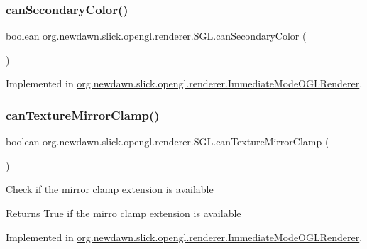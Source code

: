 \subsubsection{\texorpdfstring{can\+Secondary\+Color()}{canSecondaryColor()}}
{\footnotesize\ttfamily boolean org.\+newdawn.\+slick.\+opengl.\+renderer.\+S\+G\+L.\+can\+Secondary\+Color (\begin{DoxyParamCaption}{ }\end{DoxyParamCaption})}



Implemented in \mbox{\hyperlink{classorg_1_1newdawn_1_1slick_1_1opengl_1_1renderer_1_1_immediate_mode_o_g_l_renderer_abf83acb7f158b204c44af119d782719d}{org.\+newdawn.\+slick.\+opengl.\+renderer.\+Immediate\+Mode\+O\+G\+L\+Renderer}}.

\mbox{\label{interfaceorg_1_1newdawn_1_1slick_1_1opengl_1_1renderer_1_1_s_g_l_a57e486bcf65ca2576b735e7b4fcd654b}} 
\subsubsection{\texorpdfstring{can\+Texture\+Mirror\+Clamp()}{canTextureMirrorClamp()}}
{\footnotesize\ttfamily boolean org.\+newdawn.\+slick.\+opengl.\+renderer.\+S\+G\+L.\+can\+Texture\+Mirror\+Clamp (\begin{DoxyParamCaption}{ }\end{DoxyParamCaption})}

Check if the mirror clamp extension is available

\begin{DoxyReturn}{Returns}
True if the mirro clamp extension is available 
\end{DoxyReturn}


Implemented in \mbox{\hyperlink{classorg_1_1newdawn_1_1slick_1_1opengl_1_1renderer_1_1_immediate_mode_o_g_l_renderer_a0a78539a89f48cbb6a135a3623696cbb}{org.\+newdawn.\+slick.\+opengl.\+renderer.\+Immediate\+Mode\+O\+G\+L\+Renderer}}.

\mbox{\label{interfaceorg_1_1newdawn_1_1slick_1_1opengl_1_1renderer_1_1_s_g_l_a703b23e860de8e89ed9380d598a8a4bc}} 
